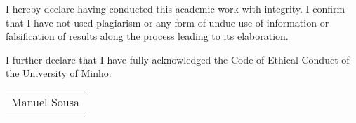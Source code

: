 I hereby declare having conducted this academic work with integrity. I confirm that I have not used plagiarism or any form of undue use of information or falsification of results along the process leading to its elaboration.

I further declare that I have fully acknowledged the Code of Ethical Conduct of the University of Minho.\\[0.5cm]

\begin{flushright}
\begin{tabular}{@{}p{1.2in}}
Manuel Sousa \\
\hrulefill \\
\end{tabular}
\end{flushright}